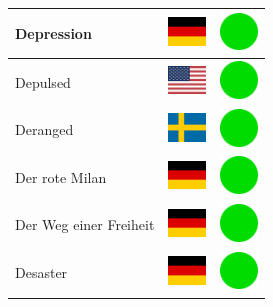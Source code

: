 \documentclass[12pt, a4paper, twoside]{report}
\begin{document}
\begin{center}
\begin{longtable}{|p{5cm}|p{2cm}|p{2cm}|}
 Depression                                                 & \includegraphics[width=1cm]{../4x3/de} &   \includegraphics[width=1cm]{../likes/y} \\ \hline
 Depulsed                                                   & \includegraphics[width=1cm]{../4x3/us} &   \includegraphics[width=1cm]{../likes/y} \\ \hline
 Deranged                                                   & \includegraphics[width=1cm]{../4x3/se} &   \includegraphics[width=1cm]{../likes/y} \\ \hline
 Der rote Milan                                             & \includegraphics[width=1cm]{../4x3/de} &   \includegraphics[width=1cm]{../likes/y} \\ \hline
 Der Weg einer Freiheit                                     & \includegraphics[width=1cm]{../4x3/de} &   \includegraphics[width=1cm]{../likes/y} \\ \hline
 Desaster                                                   & \includegraphics[width=1cm]{../4x3/de} &   \includegraphics[width=1cm]{../likes/y} \\ \hline

\end{longtable}
\end{center}
\end{document}
